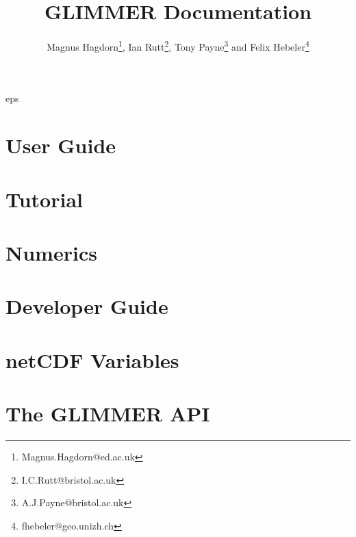 
\frontmatter
\title{GLIMMER {\glimmerver} Documentation}
\author{Magnus Hagdorn\thanks{Magnus.Hagdorn@ed.ac.uk}, Ian
  Rutt\thanks{I.C.Rutt@bristol.ac.uk}, Tony Payne\thanks{A.J.Payne@bristol.ac.uk} 
  and Felix Hebeler\thanks{fhebeler@geo.unizh.ch}}
\maketitle
\tableofcontents

{
         {eps} 
         {%
         } 

}
{}

\mainmatter
\chapter{User Guide}
\newcommand{\dir}{ug}


\chapter{Tutorial}
\renewcommand{\dir}{tut}


\chapter{Numerics}
\renewcommand{\dir}{num}


\chapter{Developer Guide}
\renewcommand{\dir}{dg}



\appendix
\renewcommand{\dir}{ug}
\chapter{netCDF Variables}

\chapter{The GLIMMER API}





